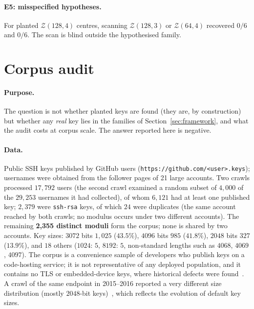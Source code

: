 \documentclass[11pt,a4paper]{article}
\newcommand{\code}[1]{\texttt{#1}}
\begin{document}
\paragraph{E5: misspecified hypotheses.} For planted $\mathcal Z(128,4)$ centres, scanning $\mathcal Z(128,3)$ or $\mathcal Z(64,4)$ recovered $0/6$ and $0/6$. The scan is blind outside the hypothesised family.


\section{Corpus audit}\label{sec:corpus}
\paragraph{Purpose.} The question is not whether planted keys are found (they are, by construction) but whether any \emph{real} key lies in the families of Section~\ref{sec:framework}, and what the audit costs at corpus scale. The answer reported here is negative.

\paragraph{Data.} Public SSH keys published by GitHub users (\code{https://github.com/<user>.keys}); usernames were obtained from the follower pages of 21 large accounts. Two crawls processed $17{,}792$ users (the second crawl examined a random subset of $4{,}000$ of the $29{,}253$ usernames it had collected), of whom $6{,}121$ had at least one published key; $2{,}379$ were \texttt{ssh-rsa} keys, of which $24$ were duplicates (the same account reached by both crawls; no modulus occurs under two different accounts). The remaining \textbf{2,355 distinct moduli} form the corpus; none is shared by two accounts. Key sizes: $3072$ bits $1{,}025$ ($43.5\%$), $4096$ bits $985$ ($41.8\%$), $2048$ bits $327$ ($13.9\%$), and $18$ others ($1024$: $5$, $8192$: $5$, non-standard lengths such as $4068$, $4069$, $4097$). The corpus is a convenience sample of developers who publish keys on a code-hosting service; it is not representative of any deployed population, and it contains no TLS or embedded-device keys, where historical defects were found~\cite{heninger,lenstra,hastings,bernstein}. A crawl of the same endpoint in 2015--2016 reported a very different size distribution (mostly $2048$-bit keys)~\cite{barbulescu}, which reflects the evolution of default key sizes.
\end{document}
